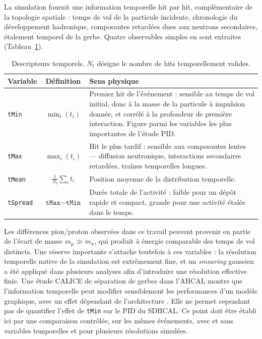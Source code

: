 La simulation fournit une information temporelle hit par hit, complémentaire de la topologie spatiale : temps de vol de la particule incidente, chronologie du développement hadronique, composantes retardées dues aux neutrons secondaires, étalement temporel de la gerbe. Quatre observables simples en sont extraites (Tableau~\ref{tab:annexeA-temps}).

\begin{table}[!ht]
    \centering
    \caption{Descripteurs temporels. \(N_t\) désigne le nombre de hits temporellement valides.}
    \label{tab:annexeA-temps}
    \small
    \begin{tabularx}{\textwidth}{@{}l c X@{}}
        \toprule
        \textbf{Variable} & \textbf{Définition} & \textbf{Sens physique} \\
        \midrule
        \texttt{tMin}
            & \(\min_i(t_i)\)
            & Premier hit de l'événement : sensible au temps de vol initial, donc à la masse de la
              particule à impulsion donnée, et corrélé à la profondeur de première interaction.
              Figure parmi les variables les plus importantes de l'étude PID. \\[4pt]
        \texttt{tMax}
            & \(\max_i(t_i)\)
            & Hit le plus tardif : sensible aux composantes lentes — diffusion neutronique,
              interactions secondaires retardées, traînes temporelles longues. \\[4pt]
        \texttt{tMean}
            & \(\tfrac{1}{N_t}\sum_i t_i\)
            & Position moyenne de la distribution temporelle. \\[2pt]
        \texttt{tSpread}
            & \(\texttt{tMax}-\texttt{tMin}\)
            & Durée totale de l'activité : faible pour un dépôt rapide et compact, grande pour une
              activité étalée dans le temps. \\
        \bottomrule
    \end{tabularx}
\end{table}

Les différences pion/proton observées dans ce travail peuvent provenir en partie de l'écart de masse \(m_p \gg m_\pi\), qui produit à énergie comparable des temps de vol distincts. Une réserve importante s'attache toutefois à ces variables : la résolution temporelle native de la simulation est extrêmement fine, et un \emph{smearing} gaussien a été appliqué dans plusieurs analyses afin d'introduire une résolution effective finie. Une étude CALICE de séparation de gerbes dans l'AHCAL montre que l'information temporelle peut modifier sensiblement les performances d'un modèle graphique, avec un effet dépendant de l'architecture \cite{calice2024showerseparation}. Elle ne permet cependant pas de quantifier l'effet de \texttt{tMin} sur le PID du SDHCAL. Ce point doit être établi ici par une comparaison contrôlée, sur les mêmes événements, avec et sans variables temporelles et pour plusieurs résolutions simulées.

